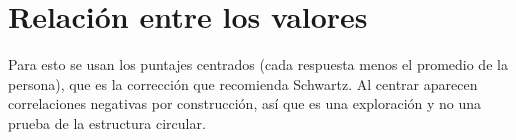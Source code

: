 \documentclass[
  spanish,
  a4paper,
  oneside]{scrbook}
\begin{document}
\begin{table}

\caption{\label{tbl-descriptivos-valor}Puntaje promedio por valor
(escala de 1 a 6)}


\end{table}%

\chapter{Relación entre los
valores}\label{relaciuxf3n-entre-los-valores}

Para esto se usan los puntajes centrados (cada respuesta menos el
promedio de la persona), que es la corrección que recomienda Schwartz.
Al centrar aparecen correlaciones negativas por construcción, así que es
una exploración y no una prueba de la estructura circular.
\end{document}
